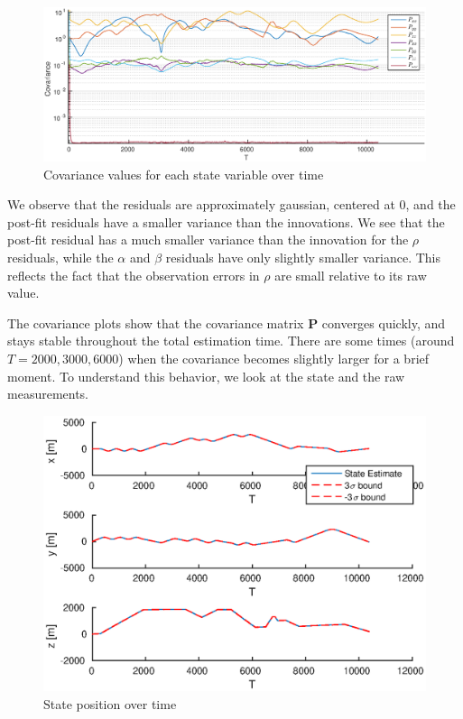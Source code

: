 \documentclass{article}
\begin{document}
\begin{figure}[!htbp]
	\centering
	\includegraphics[scale=0.5]{figs/covariance.eps}
	\caption{Covariance values for each state variable over time}
	\label{fig:covariance}
\end{figure}

We observe that the residuals are approximately gaussian, centered at 0, and the post-fit residuals have a smaller variance than the innovations. We see that the post-fit residual has a much smaller variance than the innovation for the $\rho$ residuals, while the $\alpha$ and $\beta$ residuals have only slightly smaller variance. This reflects the fact that the observation errors in $\rho$ are small relative to its raw value. 

The covariance plots show that the covariance matrix $\mathbf{P}$ converges quickly, and stays stable throughout the total estimation time. There are some times (around $T=2000, 3000, 6000$) when the covariance becomes slightly larger for a brief moment. To understand this behavior, we look at the state and the raw measurements. 


\begin{figure}[!htbp]
	\centering
	\includegraphics[scale=0.7]{figs/state_position.eps}
	\caption{State position over time}
	\label{fig:state_position}
\end{figure}
\end{document}
